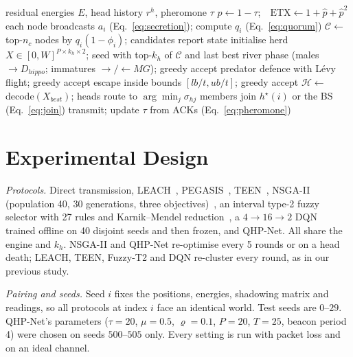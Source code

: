 \documentclass[conference]{IEEEtran}
\begin{document}
\begin{algorithm}[t]
\caption{QHP-Net epoch (every 5 rounds or on head death)}
\label{alg:qhp}
\footnotesize
\begin{algorithmic}[1]
\Require residual energies $E$, head history $r^h$, pheromone $\tau$
\State $\hat p\gets 1-\tau$;\ \ $\text{ETX}\gets 1+\hat p+\hat p^2$ 
 each node broadcasts $a_i$ (Eq.~\ref{eq:secretion}); compute $q_i$ (Eq.~\ref{eq:quorum}) \EndIf
\State $\mathcal C\gets$ top-$n_c$ nodes by $q_i(1-\phi_i)$; candidates report state 
\State initialise herd $X\in[0,W]^{P\times k_h\times2}$; seed with top-$k_h$ of $\mathcal C$ and last best
 
  \State river phase (males $\to D_{hippo}$; immatures $\to/\leftarrow MG$); greedy accept
  \State predator defence with L\'evy flight; greedy accept
  \State escape inside bounds $[lb/t,ub/t]$; greedy accept
\EndFor
\State $\mathcal H\gets$ decode$(X_{best})$; heads route to $\arg\min_j\sigma_{hj}$ 
\State members join $h^\star(i)$ or the BS (Eq.~\ref{eq:join})
 transmit; update $\tau$ from ACKs (Eq.~\ref{eq:pheromone}) \EndFor
\end{algorithmic}
\end{algorithm}

\section{Experimental Design}
\emph{Protocols.} Direct transmission, LEACH~\cite{heinzelman2000leach}, PEGASIS~\cite{lindsey2002pegasis}, TEEN~\cite{manjeshwar2001teen}, NSGA-II (population 40, 30 generations, three objectives)~\cite{deb2002nsga2}, an interval type-2 fuzzy selector with 27 rules and Karnik--Mendel reduction~\cite{karnik1999type2}, a $4{\to}16{\to}2$ DQN~\cite{mnih2015dqn} trained offline on 40 disjoint seeds and then frozen, and QHP-Net. All share the engine and $k_h$. NSGA-II and QHP-Net re-optimise every 5 rounds or on a head death; LEACH, TEEN, Fuzzy-T2 and DQN re-cluster every round, as in our previous study.

\emph{Pairing and seeds.} Seed $i$ fixes the positions, energies, shadowing matrix and readings, so all protocols at index $i$ face an identical world. Test seeds are $0$--$29$. QHP-Net's parameters ($\tau{=}20$, $\mu{=}0.5$, $\varrho{=}0.1$, $P{=}20$, $T{=}25$, beacon period 4) were chosen on seeds $500$--$505$ only. Every setting is run with packet loss and on an ideal channel.
\end{document}
